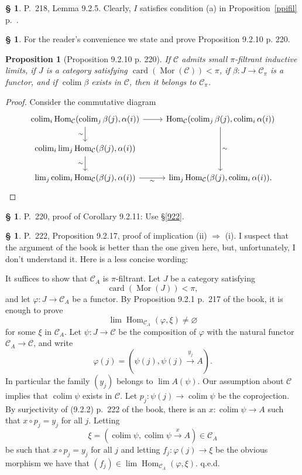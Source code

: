 \documentclass[12pt]{article}%
\newtheorem{prop}[thm]{Proposition}
\theoremstyle{remark}
\theoremstyle{definition}
\newtheorem{s}[thm]{\S}%
\newcommand{\C}{\mathcal C}
\newcommand{\pp}{\varphi}
\newcommand{\then}{\Rightarrow}
\newcommand{\xr}{\xrightarrow}
\DeclareMathOperator*{\colim}{colim}
\DeclareMathOperator{\card}{card}%
\DeclareMathOperator{\Hom}{Hom}%
\DeclareMathOperator{\Mor}{Mor}
\begin{document}
%

\begin{s}
P.~218, Lemma 9.2.5. Clearly, $I$ satisfies condition (a) in Proposition~\ref{ppifil} p.~\pageref{ppifil}. 
\end{s}

%

\begin{s}
For the reader's convenience we state and prove Proposition 9.2.10 p. 220. 

\begin{prop}[Proposition 9.2.10 p. 220]
If $\C$ admits small $\pi$-filtrant inductive limits, if $J$ is a category satisfying $\card(\Mor(\C))<\pi$, if $\beta:J\to\C_\pi$ is a functor, and if $\colim\beta$ exists in $\C$, then it belongs to $\C_\pi$. 
\end{prop}

\begin{proof}
Consider the commutative diagram
$$
\begin{tikzcd}
\colim_i\Hom_\C(\colim_j\beta(j),\alpha(i))\ar{r}\ar{d}[swap]{\sim}&\Hom_\C(\colim_j\beta(j),\colim_i\alpha(i))\ar{dd}{\sim}\\ 
\colim_i\lim_j\Hom_\C(\beta(j),\alpha(i))\ar{d}[swap]{\sim}\\ 
\lim_j\colim_i\Hom_\C(\beta(j),\alpha(i))\ar{r}[swap]{\sim}&\lim_j\Hom_\C(\beta(j),\colim_i\alpha(i)).
\end{tikzcd}
$$
\end{proof}
\end{s}

%

\begin{s} 
P.~220, proof of Corollary 9.2.11: Use \S\ref{922}.
\end{s}

%

\begin{s} 
P.~222, Proposition 9.2.17, proof of implication (ii) $\then$ (i). I suspect that the argument of the book is better than the one given here, but, unfortunately, I don't understand it. Here is a less concise wording:

It suffices to show that $\C_A$ is $\pi$-filtrant. Let $J$ be a category satisfying 
$$
\card(\Mor(J))<\pi,
$$ 
and let $\pp:J\to\C_A$ be a functor. By Proposition 9.2.1 p.~217 of the book, it is enough to prove 
$$
\lim\Hom_{\C_A}(\pp,\xi)\neq\varnothing
$$ 
for some $\xi$ in $\C_A$. Let $\psi:J\to\C$ be the composition of $\varphi$ with the natural functor $\C_A\to\C$, and write 
$$
\varphi(j)=(\psi(j),\psi(j)\xr{y_j}A).
$$ 
In particular the family $(y_j)$ belongs to $\lim A(\psi)$. Our assumption about $\C$ implies that $\colim\psi$ exists in $\C$. Let $p_j:\psi(j)\to\colim\psi$ be the coprojection. By surjectivity of (9.2.2) p.~222 of the book, there is an $x:\colim\psi\to A$ such that $x\circ p_j=y_j$ for all $j$. Letting 
$$
\xi=(\colim\psi,\colim\psi\xr x A)\in\C_A
$$ 
be such that $x\circ p_j=y_j$ for all $j$ and letting $f_j:\varphi(j)\to\xi$ be the obvious morphism we have that $(f_j)\in\lim\Hom_{\C_A}(\varphi,\xi)$. q.e.d.
\end{s}
\end{document}
